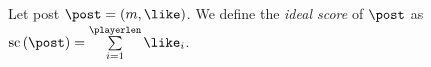 \begin{definition}
  Let post $\post = \left(m, \like\right)$. We define the \emph{ideal score} of
  $\post$ as $\mathrm{sc}\left(\post\right) = \sum\limits_{i = 1}^\playerlen
  \like_i$.
\end{definition}
